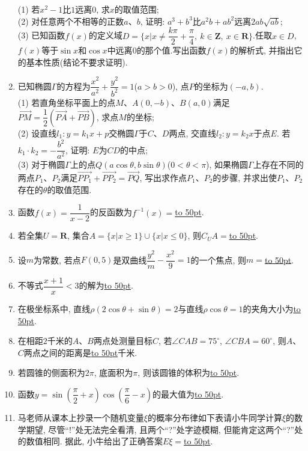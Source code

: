 \documentclass[10pt,a4paper]{article}
\newcommand{\blank}[1]{\underline{\hbox to #1pt{}}}
\begin{document}
\begin{enumerate}[1.]
(1) 若$x^2-1$比$1$远离$0$, 求$x$的取值范围;\\
(2) 对任意两个不相等的正数$a$、$b$, 证明: $a^3+b^3$比$a^2b+ab^2$远离$2ab\sqrt {ab}$;\\
(3) 已知函数$f(x)$的定义域$D=\{x| x\ne \dfrac{k\pi }2+\dfrac{\pi }4, \ k\in \mathbf{Z}, \ x\in \mathbf{R}\}$.任取$x\in D$, $f(x)$等于$\sin x$和$\cos x$中远离$0$的那个值.写出函数$f(x)$的解析式, 并指出它的基本性质(结论不要求证明).
\item 已知椭圆$\Gamma$的方程为$\dfrac{x^2}{a^2}+\dfrac{y^2}{b^2}=1$($a>b>0$), 点$P$的坐标为$(-a, b)$.\\
(1) 若直角坐标平面上的点$M$、$A(0, -b)$、$B(a, 0)$满足$\overrightarrow{PM}=\dfrac{1}{2}(\overrightarrow{PA}+\overrightarrow{PB})$, 求点$M$的坐标;\\
(2) 设直线$l_1:y=k_1x+p$交椭圆$\Gamma$于$C$、$D$两点, 交直线$l_2:y=k_2x$于点$E$. 若$k_1\cdot k_2=-\dfrac{b^2}{a^2}$, 证明: $E$为$CD$的中点;\\
(3) 对于椭圆$\Gamma$上的点$Q(a \cos\theta , b \sin\theta )$($0<\theta <\pi$), 如果椭圆$\Gamma$上存在不同的两点$P_1$、$P_2$满足$\overrightarrow{PP_1}+\overrightarrow{PP_2}=\overrightarrow{PQ}$, 写出求作点$P_1$、$P_2$的步骤, 并求出使$P_1$、$P_2$存在的$\theta$的取值范围.
\item 函数$f(x)=\dfrac 1{x-2}$的反函数为$f^{-1}(x)=$\blank{50}.
\item 若全集$U=\mathbf{R}$, 集合$A=\{x|x\ge 1\}\cup \{x|x\le 0\}$, 则$C_UA=$\blank{50}.
\item 设$m$为常数, 若点$F(0,5)$是双曲线$\dfrac{y^2}m-\dfrac{x^2}9=1$的一个焦点, 则$m=$\blank{50}.
\item 不等式$\dfrac{x+1}x<3$的解为\blank{50}.
\item 在极坐标系中, 直线$\rho (2\cos \theta +\sin \theta)=2$与直线$\rho \cos \theta =1$的夹角大小为\blank{50}.
\item 在相距$2$千米的$A$、$B$两点处测量目标$C$, 若$\angle CAB=75^\circ$, $\angle CBA=60^\circ$, 则$A$、$C$两点之间的距离是\blank{50}千米.
\item 若圆锥的侧面积为$2\pi$, 底面积为$\pi$, 则该圆锥的体积为\blank{50}.
\item 函数$y=\sin (\dfrac{\pi}2+x)\cos (\dfrac{\pi}6-x)$的最大值为\blank{50}.
\item 马老师从课本上抄录一个随机变量$\xi$的概率分布律如下表请小牛同学计算$\xi$的数学期望, 尽管``!''处无法完全看清, 且两个``?''处字迹模糊, 但能肯定这两个``?''处的数值相同. 据此, 小牛给出了正确答案$E\xi=$\blank{50}.
\begin{center}
\begin{tabular}{|c|c|c|c|}

\end{tabular}
\end{center}
\end{enumerate}
\end{document}
